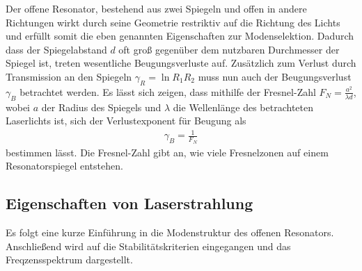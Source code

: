 Der offene Resonator, bestehend aus zwei Spiegeln und offen in andere Richtungen wirkt durch seine Geometrie restriktiv auf die Richtung des Lichts und erfüllt somit die eben genannten Eigenschaften zur Modenselektion.
Dadurch dass der Spiegelabstand $d$ oft groß gegenüber dem nutzbaren Durchmesser der Spiegel ist, treten wesentliche Beugungsverluste auf. Zusätzlich zum Verlust durch Transmission an den Spiegeln $\gamma_R=\ln{R_1R_2}$ muss nun auch der Beugungsverlust $\gamma_B$ betrachtet werden.
Es lässt sich zeigen, dass mithilfe der Fresnel-Zahl $F_N=\frac{a^2}{\lambda d}$, wobei $a$ der Radius des Spiegels und $\lambda$ die Wellenlänge des betrachteten Laserlichts ist, sich der Verlustexponent für Beugung als
\begin{align}
    \gamma_B=\frac{1}{F_N}
\end{align}
bestimmen lässt. Die Fresnel-Zahl gibt an, wie viele Fresnelzonen auf einem Resonatorspiegel entstehen.
\subsection{Eigenschaften von Laserstrahlung}\label{subsec:eigenschaften}
Es folgt eine kurze Einführung in die Modenstruktur des offenen Resonators. Anschließend wird auf die Stabilitätskriterien eingegangen und das Freqzensspektrum dargestellt.
